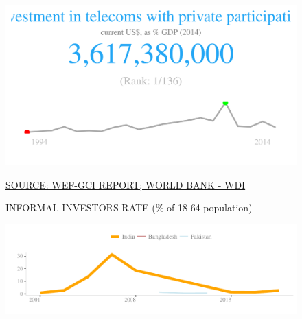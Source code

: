 \documentclass{article}\usepackage[]{graphicx}\usepackage[]{color}
\makeatletter
\def\maxwidth{ %
  \ifdim\Gin@nat@width>\linewidth
    \linewidth
  \else
    \Gin@nat@width
  \fi
}
\newenvironment{kframe}{%
 \def\at@end@of@kframe{}%
 \ifinner\ifhmode%
  \def\at@end@of@kframe{\end{minipage}}%
  \begin{minipage}{\columnwidth}%
 \fi\fi%
 \def\FrameCommand##1{\hskip\@totalleftmargin \hskip-\fboxsep
 \colorbox{shadecolor}{##1}\hskip-\fboxsep
     \hskip-\linewidth \hskip-\@totalleftmargin \hskip\columnwidth}%
 \MakeFramed {\advance\hsize-\width
   \@totalleftmargin\z@ \linewidth\hsize
   \@setminipage}}%
 {\par\unskip\endMakeFramed%
 \at@end@of@kframe}
\makeatother
\begin{document}
\begin{figure}
\begin{minipage}[c]{0.95\textwidth}
\begin{minipage}[c]{0.95\textwidth}
\begin{minipage}[c]{0.32\textwidth}
{\centering \includegraphics[width=\maxwidth]{figure/figure_sparkline_Fin2-1} 

}



      \end{minipage}
      \begin{minipage}[c]{0.32\textwidth}
\begin{kframe}


{\ttfamily\noindent\bfseries{}}\end{kframe}
      \end{minipage}
       \hspace{4ex}\scriptsize{\href{NA}{\textcolor[HTML]{22A6F5}{SOURCE: WEF-GCI REPORT; WORLD BANK - WDI}}}
  \end{minipage}
    
  \begin{minipage}[c]{0.95\textwidth} %
    \vspace*{0.6cm}
    \begin{minipage}[c]{0.49\textwidth} %
      \small{\textcolor[HTML]{818181}{INFORMAL INVESTORS RATE (\% of 18-64 population)}}


{\centering \includegraphics[width=\maxwidth]{figure/line_chart_Finance1-1} 

}




\end{minipage}
\end{minipage}
\end{minipage}
\end{figure}
\end{document}
